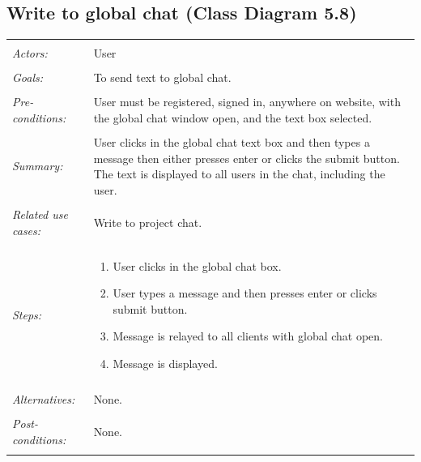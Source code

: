 \documentclass[11pt]{report}
\begin{document}
\subsection{Write to global chat (Class Diagram 5.8)}
\begin{tabular}{ p{2cm} p{12cm} }
 \hline
 \\
 \textit{Actors:} & User \\ 
 \\
 \textit{Goals:} & To send text to global chat. \\
 \\
 \textit{Pre-conditions:} & User must be registered, signed in, anywhere on website, with the global chat window open, and the text box selected.  \\
 \\
 \textit{Summary:} & User clicks in the global chat text box and then types a message then either presses enter or clicks the submit button. The text is displayed to all users in the chat, including the user. \\ 
 \\
 \textit{Related use cases:} & Write to project chat. \\ 
 \\
 \textit{Steps:} & \begin{enumerate}
  \item User clicks in the global chat box.
  \item User types a message and then presses enter or clicks submit button.
  \item Message is relayed to all clients with global chat open.
  \item Message is displayed.
 \end{enumerate} \\
 \\
 \textit{Alternatives:} & None. \\
 \\
 \textit{Post-conditions:} & None. \\
 \\
\hline
\end{tabular}
\end{document}
